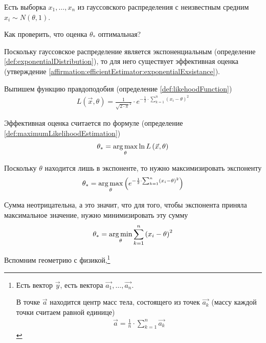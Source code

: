 \begin{example}
    Есть выборка $x_1, \dots, x_n$ из гауссовского распределения с неизвестным
    средним $x_i \sim N\left( \theta, 1 \right)$.

    Как проверить, что оценка $\theta_*$ оптимальная?

    Поскольку гауссовское распределение является экспоненциальным
    (определение \ref{def:exponentialDistribution}),
    то для него существует эффективная оценка
    (утверждение \ref{affirmation:efficientEstimator:exponentialExsistance}).

    Выпишем функцию правдоподобия (определение \ref{def:likehoodFunction})
    \begin{align*}
        L\left( \vec{x}, \theta \right)
        = \frac{1}{\sqrt{2 \cdot \pi}^2}
            \cdot e^{- \frac{1}{2}
                \cdot \sum_{k=1}^{n}\left( x_i - \theta \right)^2}
    \end{align*}

    Эффективная оценка считается по формуле (определение
    \ref{def:maximumLikelihoodEstimation})
    \begin{align*}
        \theta_* = \underset{\theta}{\operatorname{arg\,max}}\ln{L\left( \vec{x},\theta \right)}
    \end{align*}

    Поскольку $\theta$ находится лишь в экспоненте, то нужно максимизировать
    экспоненту
    \begin{align*}
        \theta_* = \underset{\theta}{\operatorname{arg\,max}}\left( e^{- \frac{1}{2}
            \cdot \sum_{k=1}^{n}\left( x_i - \theta \right)^2} \right)
    \end{align*}

    Сумма неотрицательна, а это значит, что для того, чтобы экспонента приняла
    максимальное значение, нужно минимизировать эту сумму
    \begin{align*}
        \theta_* = \underset{\theta}{\operatorname{arg\,min}}
            \sum_{k=1}^{n}\left( x_i - \theta \right)^2
    \end{align*}

    Вспомним геометрию с физикой,\footnote{
        Есть вектор $\vec{y}$, есть вектора $\vec{a_1}, \dots, \vec{a_n}$.

        В точке $\vec{a}$ находится центр масс тела, состоящего из точек
        $\vec{a_k}$ (массу каждой точки считаем равной единице)
        \begin{align*}
            \vec{a} = \frac{1}{n} \cdot \sum_{k=1}^{n} \vec{a_k}
        \end{align*}

}
\end{example}
